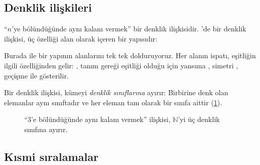 \subsection{Denklik ilişkileri}

``$n$'ye bölündüğünde aynı kalanı vermek'' bir denklik ilişkisidir.
\Lean{}'de bir denklik ilişkisi, üç özelliği alan olarak içeren bir
 yapısıdır:


\noindent Burada  ile bir yapının alanlarını tek tek
dolduruyoruz. Her alanın ispatı, eşitliğin ilgili özelliğinden gelir:
, tanım gereği  eşitliği olduğu için
yansıma , simetri , geçişme  ile
gösterilir.

Bir denklik ilişkisi, kümeyi \emph{denklik sınıflarına} ayırır: Birbirine
denk olan elemanlar aynı sınıftadır ve her eleman tam olarak bir sınıfa
aittir (\cref{fig:denklik-siniflari}).

\begin{figure}[htbp]
\centering
{}
\caption{``3'e bölündüğünde aynı kalanı vermek'' ilişkisi, $\mathbb{N}$'yi
üç denklik sınıfına ayırır.}
\label{fig:denklik-siniflari}
\end{figure}

\subsection{Kısmi sıralamalar}

